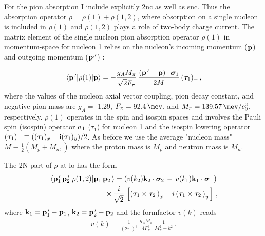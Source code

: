    For the pion absorption I include explicitly \gls{2nc} as well as \gls{snc}.
    Thus the absorption operator $\rho = \rho(1) + \rho(1, 2)$,
    where obsorption on  a single nucleon is included in $\rho(1)$ and
    $\rho(1, 2)$ plays a role of two-body charge current.
    The matrix element of the single nucleon pion absorption operator $\rho(1)$ in momentum-space for nucleon 1 relies on the
    nucleon's incoming momentum (${\bf p}$) and outgoing momentum (${\bf p}^{, \prime}$) \cite{BERNARD_1995}:

    \begin{eqnarray}
        \matrixel{{\bf p}^{\, \prime}} 
        {\rho(1)} {{\bf p}} = 
        - \frac{g_A M_\pi}{\sqrt{2} F_\pi } \,
            \frac{ \left( {\bf p}^{\, \prime} +  {\bf p} \right) \cdot {\bm \sigma}_1 } { 2 M } \, 
            ({\bm \tau}_{1})_- \, ,
    \label{rho1}
    \end{eqnarray}
    where the values of the nucleon axial vector coupling, pion decay constant, and negative pion mass are $g_A =$ 1.29, 
    $F_\pi = \SI{92.4}{\mev}$, and $M_\pi = \SI{139.57}{\mev \per \clight\squared}$, respectively. $\rho (1)$ operates in the spin
    and isospin spaces and involves the Pauli spin (isospin) operator ${\bf \sigma}_1$ ($\tau_1$) for nucleon 1 and the isospin lowering operator
    $({\bm \tau}_{1})_- \equiv(({\bm \tau}_1)_x -{\rm i} ({\bm \tau}_1)_y)/2$.
    As before we use the average 
    "nucleon mass" $M \equiv \frac{1}{2} \left( M_p + M_n , \right)$ where the proton mass is $M_p$ and neutron mass is $M_n$.



    The 2N part of $\rho$ at \gls{lo} has the form \cite{Lensky2006}
    \begin{eqnarray}
    \matrixel{
        {\bf p}_1^{\, \prime}\,
        {\bf p}_2^{\, \prime}
        } 
    {\rho(1,2)}
    {
        {\bf p}_1 \, 
        {\bf p}_2 \, 
        } = 
        \left(
        v( k_2 )  {\bf k}_2 \cdot {\bm \sigma}_2 \, - \, 
        v( k_1 )  {\bf k}_1 \cdot {\bm \sigma}_1 \,
        \right) \, \nonumber \\ \times \,
        \frac{i}{\sqrt{2}} \, 
        \left[ 
            \left( {\bm \tau}_1 \times {\bm \tau}_2 \, \right)_x 
            - i \left( {\bm \tau}_1 \times {\bm \tau}_2 \, \right)_y \,
        \right] \,,
    \label{rho12}
    \end{eqnarray}
    where 
    $ {\bf k}_1 = {\bf p}_1^{\, \prime} - {\bf p}_1 $,
    $ {\bf k}_2 = {\bf p}_2^{\, \prime} - {\bf p}_2 $
    and the formfactor $v(k)$ reads 
    \begin{eqnarray}
    v (k) = \frac 1{ \left( 2 \pi \, \right)^3 } \,
            \frac{g_A M_\pi}{4 F_\pi^3 } \,
        \frac1{M_\pi^2 + k^2 } \, .
    \label{vk}
    \end{eqnarray}

